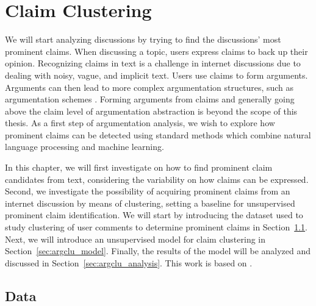 \chapter{Claim Clustering}
\label{chap:argclu}


We will start analyzing discussions by trying to find the discussions' most
prominent claims.
When discussing a topic, users express claims to back up their opinion. 
Recognizing claims in text is a challenge in internet discussions due to 
dealing with noisy, vague, and implicit text. 
Users use claims to form arguments. 
Arguments can then lead to more complex 
argumentation structures, such as argumentation schemes \citep{walton2008argumentation}. 
Forming arguments from claims and generally going above the claim level of
argumentation abstraction is beyond the scope of this thesis. 
As a first step of argumentation analysis, we wish to explore how prominent
claims can be detected using standard methods which combine natural language
processing and machine learning. 

In this chapter, we will first investigate on how to find 
prominent claim candidates from text, considering the variability on how 
claims can be expressed. Second, we investigate the possibility of 
acquiring prominent claims from an internet discussion by means of clustering, 
setting a baseline for unsupervised prominent claim identification. 
We will start by introducing the dataset used to study clustering of
user comments to determine prominent claims in Section~\ref{sec:argclu_data}.
Next, we will introduce an unsupervised
model for claim clustering in Section~\ref{sec:argclu_model}.
Finally, the results of the model will be analyzed and discussed 
in Section~\ref{sec:argclu_analysis}.
This work is based on \citep{boltuzic2015identifying}.

\section{Data}
\label{sec:argclu_data}

